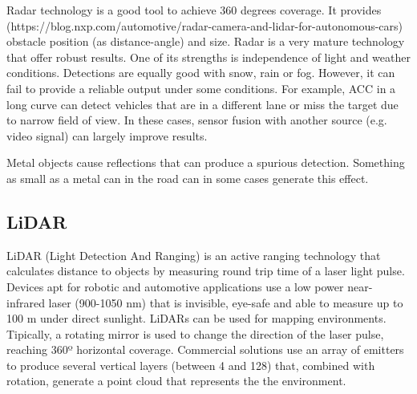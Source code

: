 Radar technology is a good tool to achieve 360 degrees coverage. It provides 
(https://blog.nxp.com/automotive/radar-camera-and-lidar-for-autonomous-cars)
obstacle position (as distance-angle) and size.
Radar is a very mature technology that offer robust results. One of its strengths is
independence of light and weather conditions. Detections are equally good with snow, rain or fog.
However, it can fail to provide a reliable output under some conditions. For example, ACC in a long curve can detect vehicles that are in a different lane or miss the target due to narrow field of view. In these cases, sensor fusion with another source (e.g. video signal) can largely improve results.

Metal objects cause reflections that can produce a spurious detection. Something as small as a metal can in the road can in some cases generate this effect.

%  



\subsection{LiDAR}
LiDAR (Light Detection And Ranging) is an active ranging technology that calculates distance to objects by measuring round trip time of a laser light pulse.
Devices apt for robotic and automotive applications use a low power near-infrared laser (900-1050 nm) that is invisible, eye-safe and able to measure up to 100 m under direct sunlight.
LiDARs can be used for mapping environments. Tipically, a rotating mirror is used to change the direction of the laser pulse, reaching 360º horizontal coverage. Commercial solutions use an array of emitters to produce several vertical layers (between 4 and 128) that, combined with rotation, generate a point cloud that represents the the environment.

